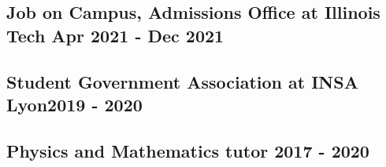 \small
	
\subsection{{ Job on Campus, Admissions Office at Illinois Tech \hfill Apr 2021 - Dec 2021}}	

	
\subsection{{ Student Government Association at INSA Lyon\hfill 2019 - 2020}}	

	
\subsection{{ Physics and Mathematics tutor \hfill 2017 - 2020}}	


